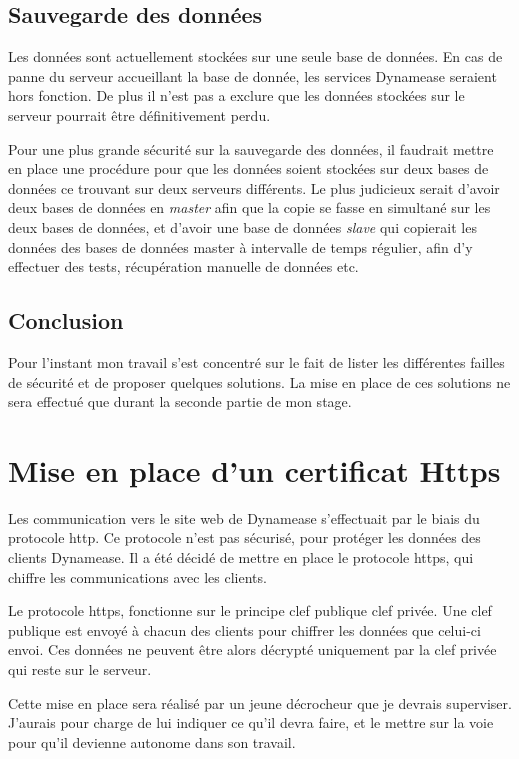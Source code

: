 \subsection{Sauvegarde des données}

Les données sont actuellement stockées sur une seule base de données. En cas de panne du serveur accueillant la base de donnée, les services Dynamease seraient hors fonction. De plus il n'est pas a exclure que les données stockées sur le serveur pourrait être définitivement perdu. 

Pour une plus grande sécurité sur la sauvegarde des données, il faudrait mettre en place une procédure pour que les données soient stockées sur deux bases de données ce trouvant sur deux serveurs différents. Le plus judicieux serait d'avoir deux bases de données en \textit{master} afin que la copie se fasse en simultané sur les deux bases de données, et d'avoir une base de données \textit{slave} qui copierait les données des bases de données master à intervalle de temps régulier, afin d'y effectuer des tests, récupération manuelle de données etc.

\subsection{Conclusion}

Pour l'instant mon travail s'est concentré sur le fait de lister les différentes failles de sécurité et de proposer quelques solutions. La mise en place de ces solutions ne sera effectué que durant la seconde partie de mon stage.

\section{Mise en place d'un certificat Https}

Les communication vers le site web de Dynamease s'effectuait par le biais du protocole http. Ce protocole n'est pas sécurisé, pour protéger les données des clients Dynamease. Il a été décidé de mettre en place le protocole https, qui chiffre les communications avec les clients.

Le protocole https, fonctionne sur le principe clef publique clef privée. Une clef publique est envoyé à chacun des clients pour chiffrer les données que celui-ci envoi. Ces données ne peuvent être alors décrypté uniquement par la clef privée qui reste sur le serveur.

Cette mise en place sera réalisé par un jeune décrocheur que je devrais superviser. J'aurais pour charge de lui indiquer ce qu'il devra faire, et le mettre sur la voie pour qu'il devienne autonome dans son travail.

